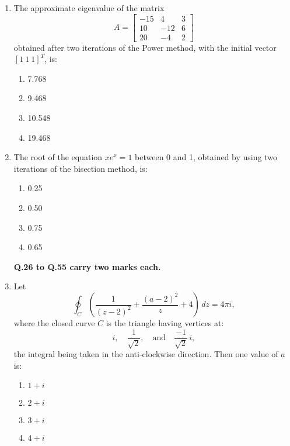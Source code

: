 \documentclass[journal,12pt,onecolumn]{IEEEtran}
\theoremstyle{remark}
\begin{document}
\begin{enumerate}[start=14]
\item The approximate eigenvalue of the matrix
\[
A = \begin{bmatrix}
-15 & 4 & 3 \\
10 & -12 & 6 \\
20 & -4 & 2 
\end{bmatrix}
\]
obtained after two iterations of the Power method, with the initial vector \([1 \ 1 \ 1]^T\), is:
\begin{enumerate}
    \item 7.768
    \item 9.468
    \item 10.548
    \item 19.468
\end{enumerate}

\item The root of the equation \(xe^x = 1\) between 0 and 1, obtained by using two iterations of the bisection method, is:
\begin{enumerate}
    \item 0.25
    \item 0.50
    \item 0.75
    \item 0.65
\end{enumerate}
\textbf{Q.26 to Q.55 carry two marks each.}
\item  Let 
\[
\oint_C \left( \frac{1}{(z - 2)^2} + \frac{(a - 2)^2}{z} + 4 \right) \, dz = 4\pi i,
\]
where the closed curve \(C\) is the triangle having vertices at:
\[
i, \quad \frac{1}{\sqrt{2}}, \quad \text{and} \quad \frac{-1}{\sqrt{2}} \, i,
\]
the integral being taken in the anti-clockwise direction. Then one value of \(a\) is:
\begin{enumerate}
    \item \(1 + i\)
    \item \(2 + i\)
    \item \(3 + i\)
    \item \(4 + i\)
\end{enumerate}

\end{enumerate}
\end{document}
